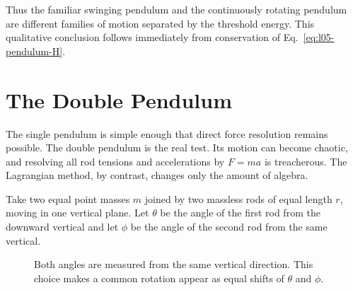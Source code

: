 \begin{classroomqa}
\end{classroomqa}

Thus the familiar swinging pendulum and the continuously rotating pendulum
are different families of motion separated by the threshold energy. This
qualitative conclusion follows immediately from conservation of
Eq.~\eqref{eq:l05-pendulum-H}.

\section{The Double Pendulum}

The single pendulum is simple enough that direct force resolution remains
possible. The double pendulum is the real test. Its motion can become chaotic,
and resolving all rod tensions and accelerations by \(F=ma\) is treacherous.
The Lagrangian method, by contrast, changes only the amount of algebra.

Take two equal point masses \(m\) joined by two massless rods of equal length
\(r\), moving in one vertical plane. Let \(\theta\) be the angle of the first
rod from the downward vertical and let \(\phi\) be the angle of the second rod
from the same vertical.

\begin{classroomqa}
\end{classroomqa}

\begin{figure}[tbp]
\centering
{}
\caption{Both angles are measured from the same vertical direction. This
choice makes a common rotation appear as equal shifts of \(\theta\) and
\(\phi\).}
\label{fig:l05-double-geometry}
\end{figure}


